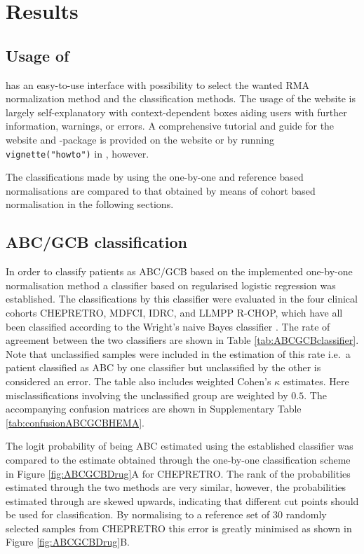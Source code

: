 \documentclass{article}
\begin{document}
\section{Results}
\subsection{Usage of \hemaClass{}}
\hemaClass{} has an easy-to-use interface with possibility to select the wanted RMA normalization method and the classification methods.
The usage of the website is largely self-explanatory with context-dependent boxes aiding users with further information, warnings, or errors.
A comprehensive tutorial and guide for the website and -package is provided on the website or by running \texttt{vignette("howto")} in \R{}, however.

The classifications made by \hemaClass{} using the one-by-one and reference based normalisations are compared to that obtained by means of cohort based normalisation in the following sections.


\subsection{ABC/GCB classification}
In order to classify patients as ABC/GCB based on the implemented one-by-one normalisation method a classifier based on regularised logistic regression was established.
The classifications by this classifier were evaluated in the four clinical cohorts CHEPRETRO, MDFCI, IDRC, and LLMPP R-CHOP, which have all been classified according to the Wright's naive Bayes classifier \citep{Wright2003,Lenz2008a}.
The rate of agreement between the two classifiers are shown in Table \ref{tab:ABCGCBclassifier}.
Note that unclassified samples were included in the estimation of this rate i.e.\ a patient classified as ABC by one classifier but unclassified by the other is considered an error.
The table also includes weighted Cohen's $\kappa$ estimates.
Here misclassifications involving the unclassified group are weighted by $0.5$.
The accompanying confusion matrices are shown in Supplementary Table \ref{tab:confusionABCGCBHEMA}.

The logit probability of being ABC estimated using the established classifier was compared to the estimate obtained through the one-by-one classification scheme in Figure \ref{fig:ABCGCBDrug}A for CHEPRETRO.
The rank of the probabilities estimated through the two methods are very similar, however, the probabilities estimated through \hemaClass{} are skewed upwards, indicating that different cut points should be used for classification.
By normalising to a reference set of $30$ randomly selected samples from CHEPRETRO this error is greatly minimised as shown in Figure \ref{fig:ABCGCBDrug}B.
\end{document}
